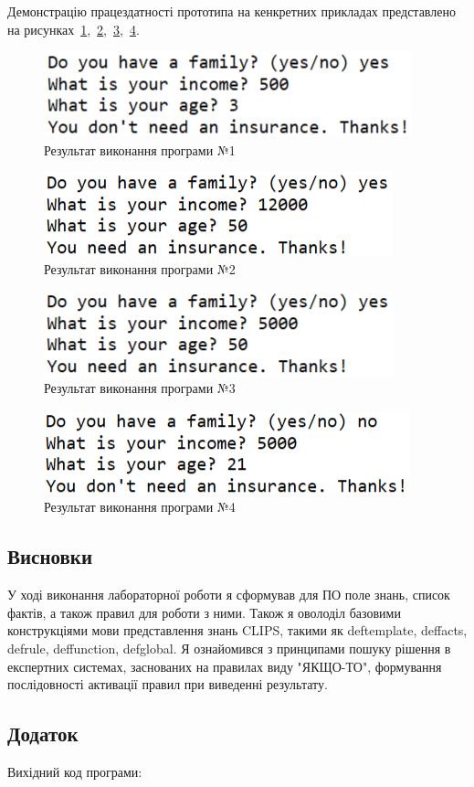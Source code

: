 Демонстрацію працездатності прототипа на кенкретних прикладах представлено на рисунках~\ref{fig:test_1},~\ref{fig:test_2},~\ref{fig:test_3},~\ref{fig:test_4}.

\begin{figure}[H]
	\centering
	    \includegraphics{test_1}
	\caption{Результат виконання програми №1}
	\label{fig:test_1}
\end{figure} 

\begin{figure}[H]
	\centering
	    \includegraphics{test_2}
	\caption{Результат виконання програми №2}
	\label{fig:test_2}
\end{figure} 

\begin{figure}[H]
	\centering
	    \includegraphics{test_3}
	\caption{Результат виконання програми №3}
	\label{fig:test_3}
\end{figure} 

\begin{figure}[H]
	\centering
	    \includegraphics{test_4}
	\caption{Результат виконання програми №4}
	\label{fig:test_4}
\end{figure} 

\subsection*{Висновки}
У ході виконання лабораторної роботи я сформував для ПО поле знань, список фактів, а також правил для роботи з ними. 
Також я оволоділ базовими конструкціями мови представлення знань CLIPS, такими як deftemplate, deffacts, defrule, deffunction, defglobal. 
Я ознайомився з принципами пошуку рішення в експертних системах, заснованих на правилах виду "ЯКЩО-ТО", формування послідовності активації правил при виведенні результату.

\subsection*{Додаток}
Вихідний код програми:
 


